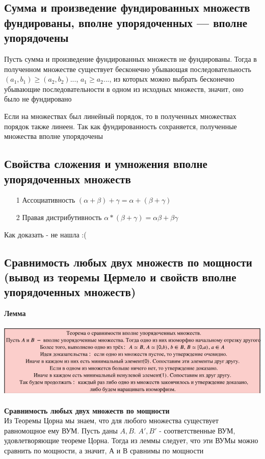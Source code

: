 \subsection{Сумма и произведение фундированных множеств фундированы, вполне упорядоченных — вполне упорядочены}
Пусть сумма и произведение  фундированных множеств не фундированы. Тогда в полученном множестве существует бесконечно убывающая последовательность $(a_1, b_1) \geq (a_2, b_2) ...$, $a_1\geq a_2 ...$, из которых можно выбрать бесконечно убывающие последовательности в одном из исходных множеств, значит, оно было не фундировано

Если на множествах был линейный порядок, то в полученных множествах порядок также линеен. Так как фундированность сохраняется, полученные множества вполне упорядочены

\subsection{Свойства сложения и умножения вполне упорядоченных множеств}
\begin{itemize}
    \item [1] Ассоциативность $(\alpha + \beta) + \gamma = \alpha + (\beta + \gamma)$
    \item [2] Правая дистрибутивность $\alpha *( \beta +\gamma) = \alpha\beta + \beta \gamma$
    
\end{itemize}
    Как доказать - не нашла :(

\subsection{Сравнимость любых двух множеств по мощности (вывод из теоремы Цермело и
свойств вполне упорядоченных множеств)}
\textbf{Лемма}\\ \\
\includegraphics[width = 17cm]{images/2 (определения)_mm1.PNG}\\ \\
\textbf{Сравнимость любых двух множеств по мощности}\\
Из Теоремы Цорна мы знаем, что для любого множества существует равномощное ему ВУМ. Пусть даны $A, B$. $A', B'$ - соответственные ВУМ, удовлетворяющие теореме Цорна. Тогда из леммы следует, что эти ВУМы можно сравнить по мощности, а значит, А и В сравнимы по мощности